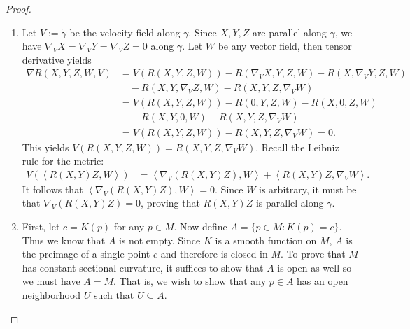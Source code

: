 \documentclass[12pt]{article}
\begin{document}
\begin{proof}
\begin{enumerate}[label=(\alph*)]
	\item Let $ V:= \dot{\gamma}$ be the velocity field along $ \gamma$. Since $ X,Y,Z$ are parallel along $ \gamma$, we have $ \nabla _V X = \nabla _V Y = \nabla _V Z = 0$ along $ \gamma$. Let $ W$ be any vector field, then tensor derivative yields
\begin{align*}
\nabla R(X,Y,Z,W,V) &= V(R(X,Y,Z,W)) - R(\nabla_V X,Y,Z,W) - R(X,\nabla_V Y, Z,W) \\
		     & \quad - R(X,Y,\nabla_VZ , W) - R(X,Y,Z,\nabla_VW) \\	
 &= V(R(X,Y,Z,W)) - R(0,Y,Z,W) - R(X,0, Z,W)\\
 & \quad - R(X,Y,0 , W) - R(X,Y,Z,\nabla_VW) \\	
 &= V(R(X,Y,Z,W)) - R(X,Y,Z,\nabla_VW) =0 .
\end{align*}
This yields $ V(R(X,Y,Z,W)) = R(X,Y,Z,\nabla_VW)$. Recall the Leibniz rule for the metric:
\begin{align*}
	V\left( \left\langle R(X,Y)Z,W \right\rangle \right) &= \left\langle \nabla_V (R(X,Y)Z), W \right\rangle + \left\langle R(X,Y)Z,\nabla_VW \right\rangle .
\end{align*}
It follows that $ \left\langle \nabla_V (R(X,Y)Z), W \right\rangle =0$. Since $ W$ is arbitrary, it must be that  $ \nabla_V (R(X,Y)Z) = 0$, proving that $ R(X,Y)Z$ is parallel along $ \gamma$.
\item First, let $ c = K(p)$ for any  $ p \in M$. Now define $ A = \{p \in M: K(p) = c\}$. Thus we know that $ A$ is not empty. Since  $ K$ is a smooth function on  $ M$,  $ A$ is the preimage of a single point $ c$ and therefore is closed in $ M$. To prove that  $ M$ has constant sectional curvature, it suffices to show that  $ A$ is open as well so we must have $ A = M$. That is, we wish to show that any $ p \in A$ has an open neighborhood  $ U$ such that  $ U \subseteq A$.


\end{enumerate}
\end{proof}
\end{document}
